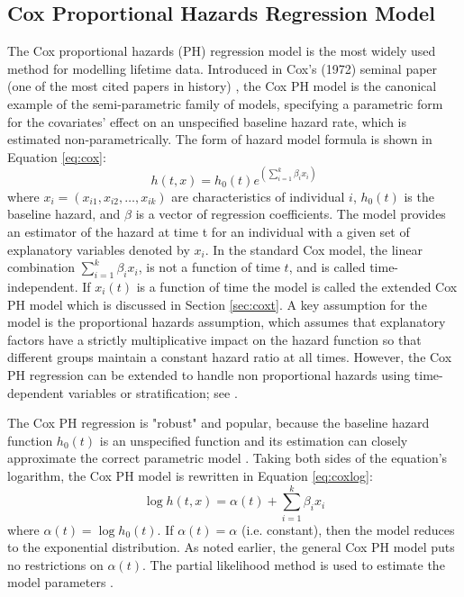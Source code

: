 \subsection{Cox Proportional Hazards Regression Model} \label{Cox.mod}
The Cox proportional hazards (PH) regression model is the most widely used method for modelling lifetime data. Introduced in Cox's (1972) seminal paper (one of the most cited papers in history) \citep{cox1975}, the Cox PH model is the canonical example of the semi-parametric family of models, specifying a parametric form for the covariates' effect on an unspecified baseline hazard rate, which is estimated non-parametrically. The form of hazard model formula is shown in Equation \ref{eq:cox}:
\begin{equation}
\label{eq:cox}
h(t,x)=h_0(t)e^{(\sum_{i=1}^{k}\beta_ix_i)}
\end{equation}
where $x_i=(x_{i1}, x_{i2}, \ldots, x_{ik})$ are characteristics of individual $i$, $h_0(t)$ is the baseline hazard, and $\beta$  is a vector of regression coefficients.
The model provides an estimator of the hazard at time t for an individual with a given set of explanatory variables denoted by $x_i$.  In the standard Cox model, the linear combination $\sum_{i=1}^{k}\beta_i x_i$, is not a function of time $t$, and is called time-independent.  If $x_i(t)$ is a function of time the model is called the extended Cox PH model which is discussed in Section \ref{sec:coxt}. A key assumption for the model is the proportional hazards assumption, which assumes that explanatory factors have a strictly multiplicative impact on the hazard function so that different groups maintain a constant hazard ratio at all times. However, the Cox PH regression can be extended to handle non proportional hazards using time-dependent variables or stratification; see \cite{kleinMosch2003}.

The Cox PH regression is "robust" and popular, because the baseline hazard function $h_0 (t)$ is an unspecified function and its estimation can closely approximate the correct parametric model \citep{kleinbaum1998}. Taking both sides of the equation's logarithm, the Cox PH model is rewritten in Equation \ref{eq:coxlog}:
\begin{equation}
\label{eq:coxlog}
\log{h(t,x)}=\alpha(t)+\sum_{i=1}^{k}\beta_ix_i
\end{equation}
where $\alpha(t)=\log{h_0(t)}$. If $\alpha(t)=\alpha$ (i.e. constant), then the model reduces to the exponential distribution. As noted earlier, the general Cox PH model puts no restrictions on $\alpha(t)$. The partial likelihood method is used to estimate the model parameters \citep{allison2010}. %


